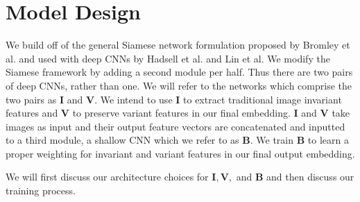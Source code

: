 \section{Model Design}
We build off of the general Siamese network formulation proposed by Bromley et al. and used with deep CNNs by Hadsell et al. and Lin et al.\cite{bromley1993signature}\cite{hadsell2006dimensionality}\cite{lin2015learning} We modify the Siamese framework by adding a second module per half. Thus there are two pairs of deep CNNs, rather than one. We will refer to the networks which comprise the two pairs as $\mathbf{I}$ and $\mathbf{V}$. We intend to use $\mathbf{I}$ to extract traditional image invariant features and $\mathbf{V}$ to preserve variant features in our final embedding. $\mathbf{I}$ and $\mathbf{V}$ take images as input and their output feature vectors are concatenated and inputted to a third module, a shallow CNN which we refer to as $\mathbf{B}$. We train $\mathbf{B}$ to learn a proper weighting for invariant and variant features in our final output embedding.

We will first discuss our architecture choices for $\mathbf{I}, \mathbf{V}, $ and $\mathbf{B}$ and then discuss our training process.



